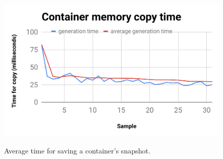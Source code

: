 \documentclass[conference]{IEEEtran}
\newcommand{\marcos}[1]{{\color{green}{MARCOS: #1}}}
\begin{document}
%
%

\begin{figure}[tb!]
\footnotesize
\caption{Average time for saving a container's snapshot.
}
\includegraphics[center,scale=0.45]{memoria_copia_ieee.pdf}
\centering
\label{fig:memoria_copia}
\end{figure}
\end{document}
